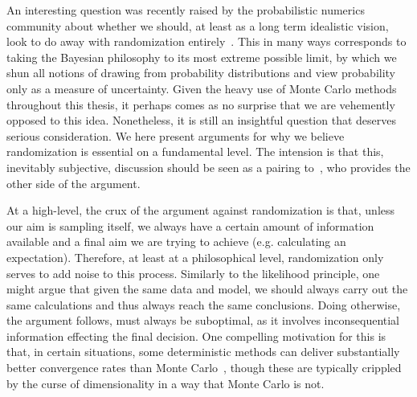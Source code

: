 An interesting question was recently raised by the probabilistic numerics~\citep{hennig2015probabilistic}
community about whether we should, at least as a long term idealistic vision, look to do away with randomization entirely~\citep{schober2017thesis}.
This in many ways corresponds to taking the Bayesian philosophy to its most extreme possible
limit, by which we shun all notions of drawing from probability distributions and view probability only as a measure
of uncertainty.  Given the heavy use of Monte Carlo methods throughout this thesis,
it perhaps comes as no surprise that we are vehemently opposed to this idea.  Nonetheless, it is still an insightful
question that deserves serious consideration.  We here present arguments for why we believe randomization is essential
on a fundamental level. The intension is that this, inevitably subjective,
discussion should be seen as a pairing to~\citep{schober2017thesis}, who provides the other side of the argument.

 At a high-level, the crux of the argument against randomization is that, 
 unless our aim 
is sampling itself, we always have a certain amount of information available and a final aim we are trying to achieve (e.g.
calculating an expectation).  Therefore, at least at a philosophical level, randomization only serves to add noise to this
process.  
Similarly to the likelihood principle, one might argue that given the same data and model, we should 
always carry out the same calculations and thus always reach the same conclusions.  Doing otherwise,
the argument follows, must always be suboptimal, as it involves inconsequential information effecting the final
decision.  One compelling motivation for this is that, in certain situations, some deterministic
methods can deliver substantially better convergence rates than Monte Carlo~\citep{briol2016fwbq,caflisch1998monte}, 
though these are typically crippled by the curse of dimensionality in a way that Monte Carlo is not.

